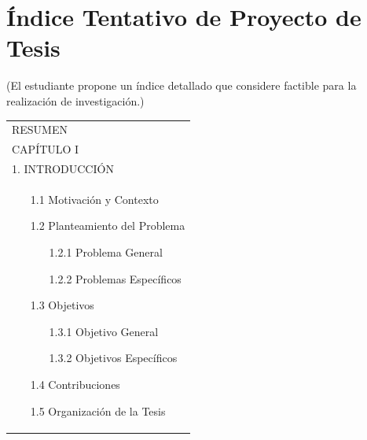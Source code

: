 \chapter{Índice Tentativo de Proyecto de Tesis}
(El estudiante propone un índice detallado que considere factible para la realización de investigación.)

\setlength{\tabcolsep}{3em} %
{\renewcommand{\arraystretch}{1.1}%
\begin{tabular}{p{17cm}}

\noindent 
RESUMEN \\
CAPÍTULO I \\
1. INTRODUCCIÓN \\
\begin{enumerate}
	\item[1.1] Motivación y Contexto
    \item[1.2] Planteamiento del Problema
    	\begin{enumerate}
			\item[1.2.1] Problema General
			\item[1.2.2] Problemas Específicos
		\end{enumerate}
	\item[1.3] Objetivos
		\begin{enumerate}
			\item[1.3.1] Objetivo General
			\item[1.3.2] Objetivos Específicos
		\end{enumerate}
	\item[1.4] Contribuciones
	\item[1.5] Organización de la Tesis

\end{enumerate}

\end{tabular}

}

